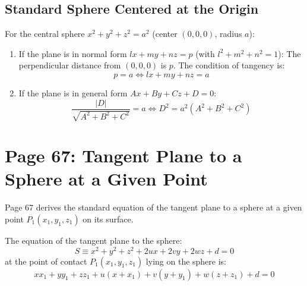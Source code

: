 \subsection{Standard Sphere Centered at the Origin}
For the central sphere $x^2 + y^2 + z^2 = a^2$ (center $(0,0,0)$, radius $a$):
\begin{enumerate}
    \item If the plane is in normal form $lx + my + nz = p$ (with $l^2+m^2+n^2=1$):
    The perpendicular distance from $(0,0,0)$ is $p$.
    The condition of tangency is:
    \begin{equation}
        \boxed{p = a \iff lx + my + nz = a}
    \end{equation}
    \item If the plane is in general form $Ax + By + Cz + D = 0$:
    \begin{equation}
        \frac{|D|}{\sqrt{A^2 + B^2 + C^2}} = a \iff \boxed{D^2 = a^2(A^2 + B^2 + C^2)}
    \end{equation}
\end{enumerate}

\section{Page 67: Tangent Plane to a Sphere at a Given Point}
\label{sec:page67}

\begin{conceptbox}
Page 67 derives the standard equation of the tangent plane to a sphere at a given point $P_1(x_1, y_1, z_1)$ on its surface.
\end{conceptbox}

\begin{theorembox}
The equation of the tangent plane to the sphere:
\begin{equation}
    S \equiv x^2 + y^2 + z^2 + 2ux + 2vy + 2wz + d = 0
\end{equation}
at the point of contact $P_1(x_1, y_1, z_1)$ lying on the sphere is:
\begin{equation}
    \boxed{x x_1 + y y_1 + z z_1 + u(x + x_1) + v(y + y_1) + w(z + z_1) + d = 0}
\end{equation}
\end{theorembox}

